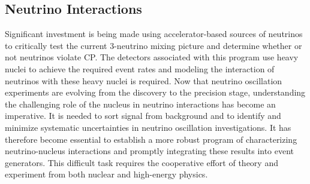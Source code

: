 \subsection{Neutrino Interactions}
\label{sec:Interactions}

Significant investment is being made using
accelerator-based sources of neutrinos to critically test the current
3-neutrino mixing picture and determine whether or not neutrinos
violate CP.
The detectors associated with this program use heavy nuclei to achieve
the required event rates and modeling the interaction of neutrinos
with these heavy nuclei is required.  Now that neutrino
oscillation experiments are evolving from the discovery to the
precision stage, understanding the challenging role of the nucleus in
neutrino interactions has become an imperative. It is needed to sort
signal from background and to identify and minimize systematic
uncertainties in neutrino oscillation investigations.
It has therefore become essential to establish a more robust program
of characterizing neutrino-nucleus interactions and promptly
integrating these results into event generators. This difficult task
requires the cooperative effort of theory and experiment from both
nuclear and high-energy physics.

